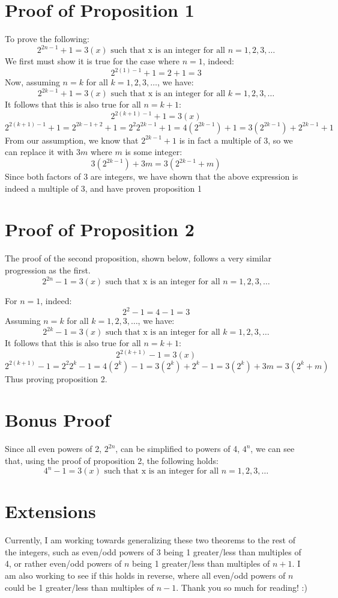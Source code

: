 \documentclass[11pt]{article}
\begin{document}
\section{Proof of Proposition 1}
To prove the following:
\[2^{2n-1} + 1 = 3(x) \mbox{ such that x is an integer for all } n = 1,2,3,\dots\]
We first must show it is true for the case where \(n=1\), indeed:
\[2^{2(1)-1} + 1 = 2 + 1 = 3\]
Now, assuming \(n=k\) for all \(k = 1,2,3,\dots\), we have:
\[2^{2k-1} + 1 = 3(x) \mbox{ such that x is an integer for all } k = 1,2,3,\dots\]
It follows that this is also true for all \(n=k+1\):
\[2^{2(k+1)-1} + 1 = 3(x)\]
\[2^{2(k+1)-1} + 1 = 2^{2k-1 + 2} + 1 = 2^2 2^{2k-1} + 1 = 4(2^{2k-1}) + 1 = 3(2^{2k-1}) + 2^{2k-1} + 1 \]
From our assumption, we know that \(2^{2k-1} + 1\) is in fact a multiple of 3, so we can replace it with \(3m\) where \(m\) is some integer:
\[3(2^{2k-1}) + 3m = 3(2^{2k-1} + m)\]
Since both factors of 3 are integers, we have shown that the above expression is indeed a multiple of 3, and have proven proposition 1

\section{Proof of Proposition 2}
The proof of the second proposition, shown below, follows a very similar progression as the first.
\[2^{2n} - 1 = 3(x) \mbox{ such that x is an integer for all } n = 1,2,3,\dots\]

For \(n=1\), indeed:
\[2^2 - 1 = 4-1 = 3\]
Assuming \(n=k\) for all \(k = 1,2,3,\dots\), we have:
\[2^{2k} - 1 = 3(x) \mbox{ such that x is an integer for all } k = 1,2,3,\dots\]
It follows that this is also true for all \(n=k+1\):
\[2^{2(k+1)} - 1 = 3(x)\]
\[2^{2(k+1)} - 1 = 2^2 2^k -1 = 4(2^k)-1= 3(2^k) + 2^k-1 = 3(2^k) + 3m = 3(2^k+m)\]
Thus proving proposition 2.

\section{Bonus Proof}
Since all even powers of 2, \(2^{2n}\), can be simplified to powers of 4, \(4^n\), we can see that, using the proof of proposition 2, the following holds:
\[4^{n} - 1 = 3(x) \mbox{ such that x is an integer for all } n = 1,2,3,\dots\]

\section{Extensions}
Currently, I am working towards generalizing these two theorems to the rest of the integers, such as even/odd powers of 3 being 1 greater/less than multiples of 4, 
or rather even/odd powers of \(n\) being 1 greater/less than multiples of \(n+1\). I am also working to see if this holds in reverse, where all even/odd powers of \(n\) could be 1 greater/less than multiples of \(n-1\).
Thank you so much for reading! :)
\end{document}
